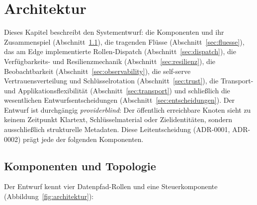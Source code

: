 \chapter{Architektur}
\label{ch:architektur}

Dieses Kapitel beschreibt den Systementwurf: die Komponenten und ihr
Zusammenspiel (Abschnitt~\ref{sec:komponenten}), die tragenden Flüsse
(Abschnitt~\ref{sec:fluesse}), das am Edge implementierte Rollen-Dispatch
(Abschnitt~\ref{sec:dispatch}), die Verfügbarkeits- und Resilienzmechanik
(Abschnitt~\ref{sec:resilienz}), die Beobachtbarkeit
(Abschnitt~\ref{sec:observability}), die self-serve
Vertrauensverteilung und Schlüsselrotation (Abschnitt~\ref{sec:trust}),
die Transport- und Applikationsflexibilität
(Abschnitt~\ref{sec:transport}) und schließlich die wesentlichen
Entwurfsentscheidungen (Abschnitt~\ref{sec:entscheidungen}). Der Entwurf ist
durchgängig \emph{providerblind}: Der öffentlich erreichbare Knoten sieht zu
keinem Zeitpunkt Klartext, Schlüsselmaterial oder Zielidentitäten, sondern
ausschließlich strukturelle Metadaten. Diese Leitentscheidung (ADR-0001,
ADR-0002) prägt jede der folgenden Komponenten.

\section{Komponenten und Topologie}
\label{sec:komponenten}

Der Entwurf kennt vier Datenpfad-Rollen und eine Steuerkomponente
(Abbildung~\ref{fig:architektur}):

